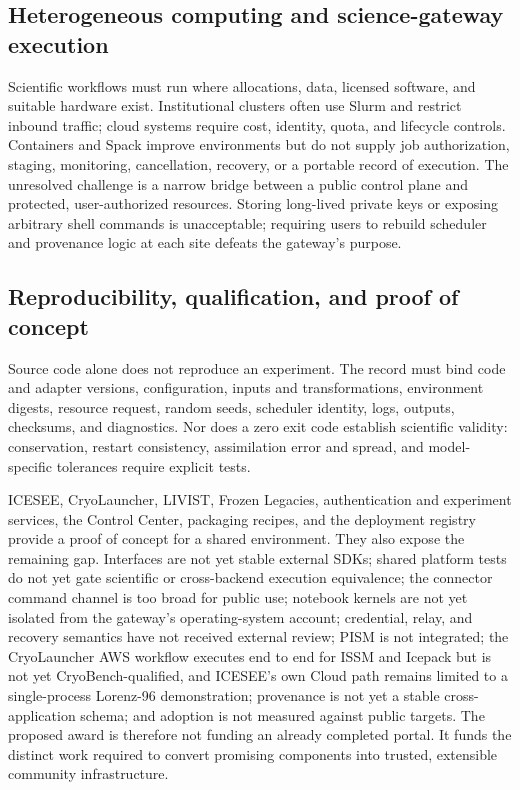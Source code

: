 \subsection{Heterogeneous computing and science-gateway execution}

Scientific workflows must run where allocations, data, licensed software,
and suitable hardware exist. Institutional clusters often use Slurm and
restrict inbound traffic; cloud systems require cost, identity, quota, and
lifecycle controls. Containers and Spack improve environments but do not supply job
authorization, staging, monitoring, cancellation, recovery, or a portable
record of execution. The unresolved challenge is a narrow bridge between
a public control plane and protected, user-authorized resources. Storing
long-lived private keys or exposing arbitrary shell commands is unacceptable;
requiring users to rebuild scheduler and provenance logic at each site defeats
the gateway's purpose.

\subsection{Reproducibility, qualification, and proof of concept}

Source code alone does not reproduce an experiment. The record must bind code
and adapter versions, configuration, inputs and transformations, environment
digests, resource request, random seeds, scheduler identity, logs, outputs,
checksums, and diagnostics. Nor does a zero exit code establish scientific
validity: conservation, restart consistency, assimilation error and spread,
and model-specific tolerances require explicit tests.

ICESEE, CryoLauncher, LIVIST, Frozen Legacies, authentication and experiment
services, the Control Center, packaging recipes, and the deployment registry
provide a proof of concept for a shared environment. They also expose the
remaining gap. Interfaces are not yet stable external SDKs; shared platform
tests do not yet gate scientific or cross-backend execution equivalence; the
connector command channel is too broad for public use; notebook kernels are not
yet isolated from the gateway's operating-system account;
credential, relay, and recovery semantics have not received external review;
PISM is not integrated; the CryoLauncher AWS workflow executes end to end
for ISSM and Icepack but is not yet CryoBench-qualified, and ICESEE's own
Cloud path remains limited to a single-process Lorenz-96 demonstration;
provenance is not yet a stable cross-application schema; and adoption is not
measured against public targets.
The proposed award is therefore not funding an already completed portal. It
funds the distinct work required to convert promising components into trusted,
extensible community infrastructure.

